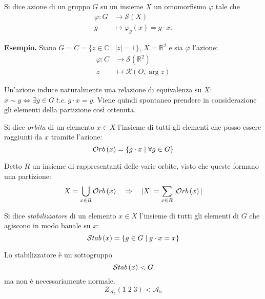 \begin{multicols}{2}
\begin{definition}[Azione]
	Si dice azione di un gruppo $ G $ su un insieme $ X $ un omomorfismo $ \varphi $ tale che \begin{align*}
	\varphi \colon G &\to \mathcal{S}\left(X\right) \\
	g &\mapsto \varphi_g(x) = g \cdot x.
	\end{align*}
\end{definition}

\textbf{Esempio.} Siano $ G = C = \{ z \in \mathbb{C} \mid |z| = 1 \} $, $ X = \mathbb{R}^2 $ e sia $ \varphi $ l'azione: \begin{align*}
\varphi \colon C &\to \mathcal{S}\left(\mathbb{R}^2\right) \\
z &\mapsto \mathcal{R}(O, \arg z)
\end{align*}

\begin{remark}
	Un'azione induce naturalmente una relazione di equivalenza su $ X $: $ x \sim y \Leftrightarrow \exists g \in G \; t.c.\; g \cdot x = y $. Viene quindi spontaneo prendere in considerazione gli elementi della partizione così ottenuta. 
\end{remark}
\begin{definition}[Orbita]
	Si dice \emph{orbita} di un elemento $ x \in X $ l'insieme di tutti gli elementi che posso essere raggiunti da $ x $ tramite l'azione: \[ \mathcal{O}rb\left( x \right) = \{ g \cdot x \mid \forall g \in G \} \]
\end{definition}
\begin{remark}
	Detto $ R $ un insieme di rappresentanti delle varie orbite, visto che queste formano una partizione: \[ X = \bigcup_{x \in R} \mathcal{O}rb\left( x \right) \quad\Rightarrow\quad |X| = \sum_{x \in R} |\mathcal{O}rb\left( x \right)| \]
\end{remark}

\begin{definition}[Stabilizzatore]
	Si dice \emph{stabilizzatore} di un elemento $ x \in X $ l'insieme di tutti gli elementi di $ G $ che agiscono in modo banale su $ x $: \[ \mathcal{S}tab\left( x \right) = \{ g \in G \mid g \cdot x = x \} \]
\end{definition}
\begin{remark}
	Lo stabilizzatore è un sottogruppo $$ \mathcal{S}tab\left( x \right) < G $$ ma non è necessariamente normale. $$  Z_{\mathcal{A}_{5}}(1 \; 2 \; 3) < \mathcal{A}_{5}$$
\end{remark}


\end{multicols}
